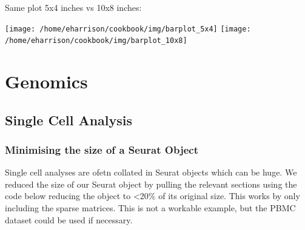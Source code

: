 \documentclass[
]{book}
\begin{document}
Same plot 5x4 inches vs 10x8 inches:

\texttt{[image: /home/eharrison/cookbook/img/barplot\_5x4]}
\texttt{[image: /home/eharrison/cookbook/img/barplot\_10x8]}

\hypertarget{genomics}{%
\chapter{Genomics}\label{genomics}}

\hypertarget{single-cell-analysis}{%
\section{Single Cell Analysis}\label{single-cell-analysis}}

\hypertarget{minimising-the-size-of-a-seurat-object}{%
\subsection{Minimising the size of a Seurat Object}\label{minimising-the-size-of-a-seurat-object}}

Single cell analyses are ofetn collated in Seurat objects which can be huge. We reduced the size of our Seurat object by pulling the relevant sections using the code below reducing the object to \textless20\% of its original size. This works by only including the sparse matrices. This is not a workable example, but the PBMC dataset could be used if necessary.
\end{document}
